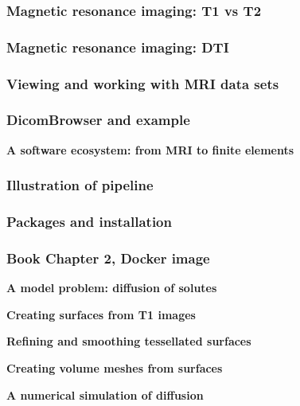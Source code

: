 \documentclass[mathserif, aspectratio=169]{beamer}
\newcommand{\mysection}[1]{\begin{frame} \begin{center} \vspace{3em} \textbf{#1} \end{center} \end{frame}}
\begin{document}
\begin{frame}
  \frametitle{Magnetic resonance imaging: T1 vs T2}
\end{frame}

\begin{frame}
  \frametitle{Magnetic resonance imaging: DTI}
\end{frame}

\begin{frame}
  \frametitle{Viewing and working with MRI data sets}
\end{frame}

\begin{frame}
  \frametitle{DicomBrowser and example}
\end{frame}

\mysection{A software ecosystem: from MRI to finite elements}

\begin{frame}
\frametitle{Illustration of pipeline}
\end{frame}

\begin{frame}
\frametitle{Packages and installation}
\end{frame}

\begin{frame}
\frametitle{Book Chapter 2, Docker image}
\end{frame}

%
% 
%

\mysection{A model problem: diffusion of solutes}

\mysection{Creating surfaces from T1 images}

\mysection{Refining and smoothing tessellated surfaces}

\mysection{Creating volume meshes from surfaces}

\mysection{A numerical simulation of diffusion}

  \begin{frame}
\frametitle{}
\end{frame}


\end{document}
